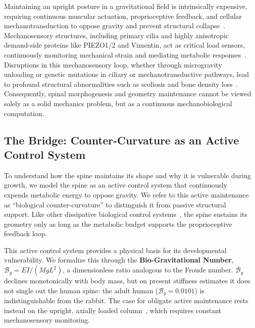 Maintaining an upright posture in a gravitational field is intrinsically expensive, requiring continuous muscular actuation, proprioceptive feedback, and cellular mechanotransduction to oppose gravity and prevent structural collapse~\cite{latimer2005upright, bastien2013unifying, govey2013gravity, proske2012proprioceptive}. Mechanosensory structures, including primary cilia and highly anisotropic demand-side proteins like PIEZO1/2 and Vimentin, act as critical load sensors, continuously monitoring mechanical strain and mediating metabolic responses~\cite{assaraf2020piezo2, coste2010piezo, hu2019vimentin}. Disruptions in this mechanosensory loop, whether through microgravity unloading or genetic mutations in ciliary or mechanotransductive pathways, lead to profound structural abnormalities such as scoliosis and bone density loss~\cite{lv2023yap, djebar2024astrogliosis, ramli2024piezo1}. Consequently, spinal morphogenesis and geometry maintenance cannot be viewed solely as a solid mechanics problem, but as a continuous mechanobiological computation.

\subsection{The Bridge: Counter-Curvature as an Active Control System}
To understand how the spine maintains its shape and why it is vulnerable during growth, we model the spine as an active control system that continuously expends metabolic energy to oppose gravity. We refer to this active maintenance as ``biological counter-curvature'' to distinguish it from passive structural support. Like other dissipative biological control systems~\cite{prigogine1977self, friston2013life}, the spine sustains its geometry only as long as the metabolic budget supports the proprioceptive feedback loop.

This active control system provides a physical basis for its developmental vulnerability. We formalize this through the \textbf{Bio-Gravitational Number}, $\mathcal{B}_g = EI / (M g L^2)$, a dimensionless ratio analogous to the Froude number. $\mathcal{B}_g$ declines monotonically with body mass, but on present stiffness estimates it does not single out the human spine: the adult human ($\mathcal{B}_g = 0.0101$) is indistinguishable from the rabbit. The case for obligate active maintenance rests instead on the upright, axially loaded column~\cite{lovejoy2005hominid, Meyer_2021}, which requires constant mechanosensory monitoring.

